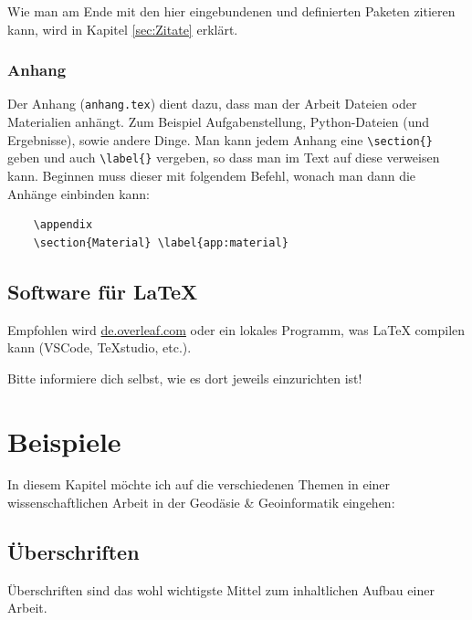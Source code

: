 Wie man am Ende mit den hier eingebundenen und definierten Paketen zitieren kann, wird in Kapitel \ref{sec:Zitate} erklärt.


\subsubsection{Anhang}

Der Anhang (\verb|anhang.tex|) dient dazu, dass man der Arbeit Dateien oder Materialien anhängt. Zum Beispiel Aufgabenstellung, Python-Dateien (und Ergebnisse), sowie andere Dinge. Man kann jedem Anhang eine \verb|\section{}| geben und auch \verb|\label{}| vergeben, so dass man im Text auf diese verweisen kann. Beginnen muss dieser mit folgendem Befehl, wonach man dann die Anhänge einbinden kann:

\begin{verbatim}
    \appendix
    \section{Material} \label{app:material}
\end{verbatim}


\subsection{Software für \LaTeX}

Empfohlen wird \textcolor{HCU}{\href{https://de.overleaf.com/}{de.overleaf.com}} oder ein lokales Programm, was \LaTeX{} compilen kann (VSCode, TeXstudio, etc.).

\textcolor{red1}{Bitte informiere dich selbst, wie es dort jeweils einzurichten ist!}


\section{Beispiele} \label{sec:Bsp}

In diesem Kapitel möchte ich auf die verschiedenen Themen in einer wissenschaftlichen Arbeit in der \glqq Geodäsie \& Geoinformatik\grqq{} eingehen:


\subsection{Überschriften}

Überschriften sind das wohl wichtigste Mittel zum inhaltlichen Aufbau einer Arbeit.


